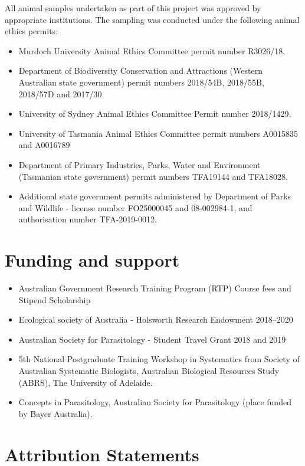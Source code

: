 \documentclass[a4paper, nobind]{templates/ociamthesis}
\providecommand{\tightlist}{%
  \setlength{\itemsep}{0pt}\setlength{\parskip}{0pt}}
\begin{document}
All animal samples undertaken as part of this project was approved by appropriate institutions. The sampling was conducted under the following animal ethics permits:

\begin{itemize}
\tightlist
\item
  Murdoch University Animal Ethics Committee permit number R3026/18.
\item
  Department of Biodiversity Conservation and Attractions (Western Australian state government) permit numbers 2018/54B, 2018/55B, 2018/57D and 2017/30.
\item
  University of Sydney Animal Ethics Committee Permit number 2018/1429.
\item
  University of Tasmania Animal Ethics Committee permit numbers A0015835 and A0016789
\item
  Department of Primary Industries, Parks, Water and Environment (Tasmanian state government) permit numbers TFA19144 and TFA18028.
\item
  Additional state government permits administered by Department of Parks and Wildlife - license number FO25000045 and 08-002984-1, and authorisation number TFA-2019-0012.
\end{itemize}

\hypertarget{funding-and-support}{%
\section*{Funding and support}\label{funding-and-support}}

\begin{itemize}
\tightlist
\item
  Australian Government Research Training Program (RTP) Course fees and Stipend Scholarship
\item
  Ecological society of Australia - Holsworth Research Endowment 2018--2020
\item
  Australian Society for Parasitology - Student Travel Grant 2018 and 2019
\item
  5th National Postgraduate Training Workshop in Systematics from Society of Australian Systematic Biologists, Australian Biological Resources Study (ABRS), The University of Adelaide.
\item
  Concepts in Parasitology, Australian Society for Parasitology (place funded by Bayer Australia).
\end{itemize}

\hypertarget{attribution-statements}{%
\section*{Attribution Statements}\label{attribution-statements}}
\end{document}
